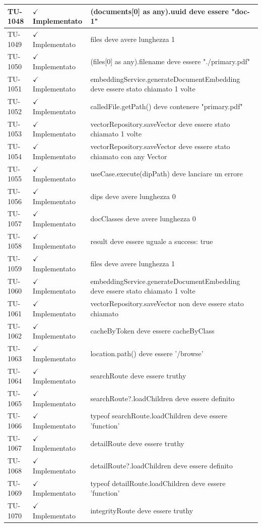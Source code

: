 ﻿\documentclass[a4paper,12pt]{article}
\newcommand{\ok}{\textcolor{green!60!black}{$\checkmark$ Implementato}}
\begin{document}
\begin{longtable}{|p{2cm}|p{3.5cm}|p{9.5cm}|}
\hline
TU-1048 & \ok & (documents[0] as any).uuid deve essere "doc-1" \\
\hline
TU-1049 & \ok & files deve avere lunghezza 1 \\
\hline
TU-1050 & \ok & (files[0] as any).filename deve essere "./primary.pdf" \\
\hline
TU-1051 & \ok & embeddingService.generateDocumentEmbedding deve essere stato chiamato 1 volte \\
\hline
TU-1052 & \ok & calledFile.getPath() deve contenere "primary.pdf" \\
\hline
TU-1053 & \ok & vectorRepository.saveVector deve essere stato chiamato 1 volte \\
\hline
TU-1054 & \ok & vectorRepository.saveVector deve essere stato chiamato con any Vector \\
\hline
TU-1055 & \ok & useCase.execute(dipPath) deve lanciare un errore \\
\hline
TU-1056 & \ok & dips deve avere lunghezza 0 \\
\hline
TU-1057 & \ok & docClasses deve avere lunghezza 0 \\
\hline
TU-1058 & \ok & result deve essere uguale a { success: true } \\
\hline
TU-1059 & \ok & files deve avere lunghezza 1 \\
\hline
TU-1060 & \ok & embeddingService.generateDocumentEmbedding deve essere stato chiamato 1 volte \\
\hline
TU-1061 & \ok & vectorRepository.saveVector non deve essere stato chiamato \\
\hline
TU-1062 & \ok & cacheByToken deve essere cacheByClass \\
\hline
TU-1063 & \ok & location.path() deve essere '/browse' \\
\hline
TU-1064 & \ok & searchRoute deve essere truthy \\
\hline
TU-1065 & \ok & searchRoute?.loadChildren deve essere definito \\
\hline
TU-1066 & \ok & typeof searchRoute.loadChildren deve essere 'function' \\
\hline
TU-1067 & \ok & detailRoute deve essere truthy \\
\hline
TU-1068 & \ok & detailRoute?.loadChildren deve essere definito \\
\hline
TU-1069 & \ok & typeof detailRoute.loadChildren deve essere 'function' \\
\hline
TU-1070 & \ok & integrityRoute deve essere truthy \\

\end{longtable}
\end{document}
